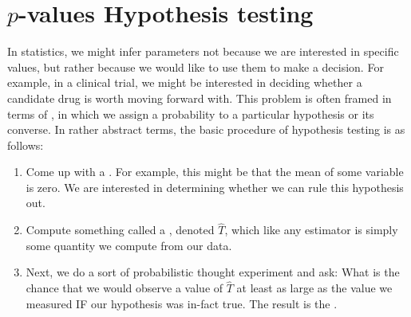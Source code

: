 \section{$p$-values Hypothesis testing}
In statistics, we might infer parameters not because we are interested in specific values, but rather because we would like to use them to make a decision. For example, in a clinical trial, we might be interested in deciding whether a candidate drug is worth moving forward with. This problem is often framed in terms of , in which we assign a probability to a particular hypothesis or its converse. 
In rather abstract terms, the basic procedure of hypothesis testing is as follows:
\begin{enumerate}
\item Come up with a . For example, this might be that the mean of some variable is zero. We are interested in determining whether we can rule this hypothesis out. 
\item Compute something called a , denoted $\hat{T}$, which like any estimator is simply some quantity we compute from our data. 
\item Next, we do a sort of probabilistic thought experiment and ask: What is the chance that we would observe a value of $\hat{T}$ at least as large as the value we measured  IF our hypothesis was in-fact true.  The result is the . 
\end{enumerate}

